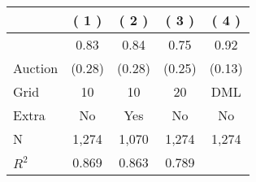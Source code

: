 
\begin{tabular}{lcccc}
\toprule
 & ( 1 ) & ( 2 ) & ( 3 ) & ( 4 )\\
\midrule
 & 0.83 & 0.84 & 0.75 & 0.92\\

\multirow{-2}{*}{\raggedright\arraybackslash Auction} & (0.28) & (0.28) & (0.25) & (0.13)\\

\midrule
Grid & 10 & 10 & 20 & DML\\

Extra & No & Yes & No & No\\

N & 1,274 & 1,070 & 1,274 & 1,274\\

$R^2$ & 0.869 & 0.863 & 0.789 & \\
\bottomrule
\end{tabular}
